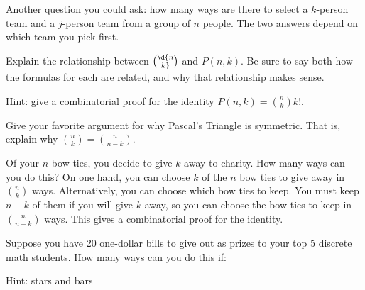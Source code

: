 \begin{questions}
\begin{answer}
		Another question you could ask: how many ways are there to select a $k$-person team and a $j$-person team from a group of $n$ people.  The two answers depend on which team you pick first.
	\end{answer}



\question Explain the relationship between $\d{n\choose k}$ and $P(n,k)$.  Be sure to say both how the formulas for each are related, and why that relationship makes sense.

	\begin{answer}
		Hint: give a combinatorial proof for the identity $P(n,k) = {n \choose k} k!$.
	\end{answer}




\question Give your favorite argument for why Pascal's Triangle is symmetric.  That is, explain why \({n \choose k} = {n \choose n-k}\).

	\begin{answer}
		Of your $n$ bow ties, you decide to give $k$ away to charity.  How many ways can you do this?  On one hand, you can choose $k$ of the $n$ bow ties to give away in ${n \choose k}$ ways.  Alternatively, you can choose which bow ties to keep.  You must keep $n -k$ of them if you will give $k$ away, so you can choose the bow ties to keep in ${n \choose n-k}$ ways.  This gives a combinatorial proof for the identity.
	\end{answer}





\question Suppose you have 20 one-dollar bills to give out as prizes to your top 5 discrete math students.  How many ways can you do this if:

	\begin{answer}
		Hint: stars and bars%
		\begin{parts}

\end{parts}
\end{answer}
\end{questions}
